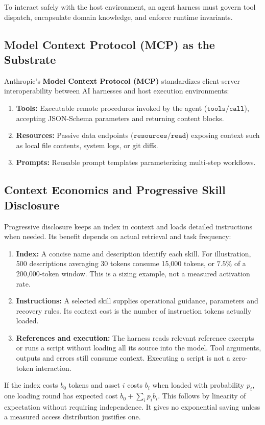 To interact safely with the host environment, an agent harness must govern tool dispatch, encapsulate domain knowledge, and enforce runtime invariants.

\subsection{Model Context Protocol (MCP) as the Substrate}

Anthropic's \textbf{Model Context Protocol (MCP)} standardizes client-server interoperability between AI harnesses and host execution environments:
\begin{enumerate}[leftmargin=1.8em,itemsep=2pt]
  \item \textbf{Tools:} Executable remote procedures invoked by the agent ($\mathtt{tools/call}$), accepting JSON-Schema parameters and returning content blocks.
  \item \textbf{Resources:} Passive data endpoints ($\mathtt{resources/read}$) exposing context such as local file contents, system logs, or git diffs.
  \item \textbf{Prompts:} Reusable prompt templates parameterizing multi-step workflows.
\end{enumerate}

\subsection{Context Economics and Progressive Skill Disclosure}

Progressive disclosure keeps an index in context and loads detailed instructions when needed. Its benefit depends on actual retrieval and task frequency:
\begin{enumerate}[leftmargin=1.8em,itemsep=3pt]
  \item \textbf{Index:} A concise name and description identify each skill. For illustration, 500 descriptions averaging 30 tokens consume 15,000 tokens, or $7.5\%$ of a 200,000-token window. This is a sizing example, not a measured activation rate.
  \item \textbf{Instructions:} A selected skill supplies operational guidance, parameters and recovery rules. Its context cost is the number of instruction tokens actually loaded.
  \item \textbf{References and execution:} The harness reads relevant reference excerpts or runs a script without loading all its source into the model. Tool arguments, outputs and errors still consume context. Executing a script is not a zero-token interaction.
\end{enumerate}
If the index costs $b_0$ tokens and asset $i$ costs $b_i$ when loaded with probability $p_i$, one loading round has expected cost $b_0+\sum_i p_i b_i$. This follows by linearity of expectation without requiring independence. It gives no exponential saving unless a measured access distribution justifies one.

